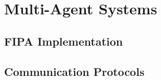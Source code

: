 \chapter{Multi-Agent Systems}
\label{appx-b:multi-agent-systems}

\section{FIPA Implementation}

\section{Communication Protocols}